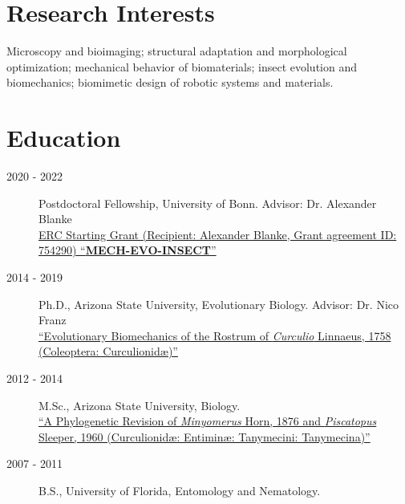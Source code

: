 \documentclass[12pt,a4paper]{article}
\begin{document}
\section*{Research Interests}
	Microscopy and bioimaging;
	structural adaptation and morphological optimization;
	mechanical behavior of biomaterials;
	insect evolution and biomechanics;
	biomimetic design of robotic systems and materials.

\section*{Education}
	\begin{description}
		\item [2020 - 2022] Postdoctoral Fellowship, University of Bonn. Advisor: Dr. Alexander Blanke
		\\ \href{https://cordis.europa.eu/project/id/754290}{ERC Starting Grant (Recipient: Alexander Blanke, Grant agreement ID: 754290) ``\textbf{MECH-EVO-INSECT}''}
		\item [2014 - 2019] Ph.D., Arizona State University, Evolutionary Biology. Advisor: Dr. Nico Franz
		\\ \href{https://repository.asu.edu/items/53836}{``Evolutionary Biomechanics of the Rostrum of \textit{Curculio} Linnaeus, 1758
		(Coleoptera: Curculionid\ae)''}
		\item [2012 - 2014] M.Sc., Arizona State University, Biology.
		\\ \href{https://repository.asu.edu/items/25115}{``A Phylogenetic Revision of \textit{Minyomerus} Horn, 1876 and \textit{Piscatopus} Sleeper, 1960
		(Curculionid\ae: Entimin\ae: Tanymecini: Tanymecina)''}
		\item [2007 - 2011] B.S., University of Florida, Entomology and Nematology.
	\end{description}
\end{document}
